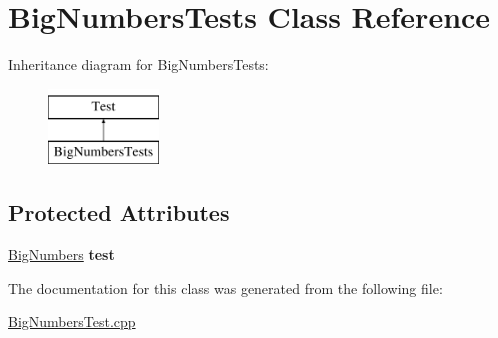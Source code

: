 \hypertarget{classBigNumbersTests}{}\section{Big\+Numbers\+Tests Class Reference}
\label{classBigNumbersTests}
Inheritance diagram for Big\+Numbers\+Tests\+:\begin{figure}[H]
\begin{center}
\leavevmode
\includegraphics[height=2.000000cm]{classBigNumbersTests}
\end{center}
\end{figure}
\subsection*{Protected Attributes}
\begin{DoxyCompactItemize}
\item 
\mbox{\label{classBigNumbersTests_a206da9922c546905135997f7e8ddadd4}} 
\mbox{\hyperlink{classBigNumbers}{Big\+Numbers}} {\bfseries test}
\end{DoxyCompactItemize}


The documentation for this class was generated from the following file\+:\begin{DoxyCompactItemize}
\item 
\mbox{\hyperlink{BigNumbersTest_8cpp}{Big\+Numbers\+Test.\+cpp}}\end{DoxyCompactItemize}
